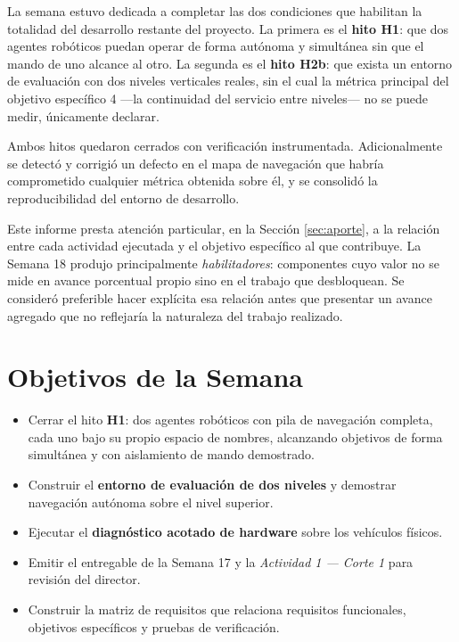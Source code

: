 \documentclass[12pt,letterpaper]{article}
\begin{document}
La semana estuvo dedicada a completar las dos condiciones que habilitan la totalidad del desarrollo restante del proyecto. La primera es el \textbf{hito H1}: que dos agentes robóticos puedan operar de forma autónoma y simultánea sin que el mando de uno alcance al otro. La segunda es el \textbf{hito H2b}: que exista un entorno de evaluación con dos niveles verticales reales, sin el cual la métrica principal del objetivo específico 4 ---la continuidad del servicio entre niveles--- no se puede medir, únicamente declarar.

Ambos hitos quedaron cerrados con verificación instrumentada. Adicionalmente se detectó y corrigió un defecto en el mapa de navegación que habría comprometido cualquier métrica obtenida sobre él, y se consolidó la reproducibilidad del entorno de desarrollo.

Este informe presta atención particular, en la Sección \ref{sec:aporte}, a la relación entre cada actividad ejecutada y el objetivo específico al que contribuye. La Semana 18 produjo principalmente \emph{habilitadores}: componentes cuyo valor no se mide en avance porcentual propio sino en el trabajo que desbloquean. Se consideró preferible hacer explícita esa relación antes que presentar un avance agregado que no reflejaría la naturaleza del trabajo realizado.

\section{Objetivos de la Semana}

\begin{itemize}
    \item Cerrar el hito \textbf{H1}: dos agentes robóticos con pila de navegación completa, cada uno bajo su propio espacio de nombres, alcanzando objetivos de forma simultánea y con aislamiento de mando demostrado.
    \item Construir el \textbf{entorno de evaluación de dos niveles} y demostrar navegación autónoma sobre el nivel superior.
    \item Ejecutar el \textbf{diagnóstico acotado de hardware} sobre los vehículos físicos.
    \item Emitir el entregable de la Semana 17 y la \textit{Actividad 1 --- Corte 1} para revisión del director.
    \item Construir la matriz de requisitos que relaciona requisitos funcionales, objetivos específicos y pruebas de verificación.
\end{itemize}
\end{document}
